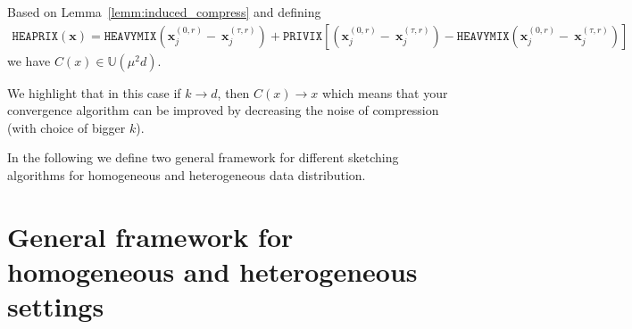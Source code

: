 \begin{corollary}
Based on Lemma~\ref{lemm:induced_compress} and defining 
\begin{align}
    \texttt{HEAPRIX}(\boldsymbol{x})=\texttt{HEAVYMIX}\left(\boldsymbol{x}_j^{(0,r)}-~{\boldsymbol{x}}_{j}^{(\tau,r)}\right)+\texttt{PRIVIX}\left[\left(\boldsymbol{x}_j^{(0,r)}-~{\boldsymbol{x}}_{j}^{(\tau,r)}\right)-\texttt{HEAVYMIX}\left(\boldsymbol{x}_j^{(0,r)}-~{\boldsymbol{x}}_{j}^{(\tau,r)}\right)\right]
\end{align}
we have $C(x)\in \mathbb{U}(\mu^2 d)$.
\end{corollary}
\begin{remark}
We highlight that in this case if $k\rightarrow d$, then $C(x)\rightarrow x$ which means that your convergence algorithm can be improved by decreasing the noise of compression (with choice of bigger $k$). 
\end{remark}

In the following we define two general framework for different sketching algorithms for homogeneous and heterogeneous data distribution.
\section{General framework for homogeneous and heterogeneous settings}

